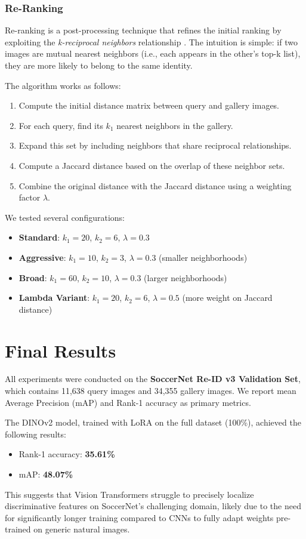 \documentclass[10pt,twocolumn,letterpaper]{article}
\begin{document}
\subsubsection{Re-Ranking}
Re-ranking is a post-processing technique that refines the initial ranking by exploiting the \textit{k-reciprocal neighbors} relationship \cite{reranking}. The intuition is simple: if two images are mutual nearest neighbors (i.e., each appears in the other's top-k list), they are more likely to belong to the same identity.

The algorithm works as follows:
\begin{enumerate}
    \item Compute the initial distance matrix between query and gallery images.
    \item For each query, find its $k_1$ nearest neighbors in the gallery.
    \item Expand this set by including neighbors that share reciprocal relationships.
    \item Compute a Jaccard distance based on the overlap of these neighbor sets.
    \item Combine the original distance with the Jaccard distance using a weighting factor $\lambda$.
\end{enumerate}

We tested several configurations:
\begin{itemize}
    \item \textbf{Standard}: $k_1=20$, $k_2=6$, $\lambda=0.3$
    \item \textbf{Aggressive}: $k_1=10$, $k_2=3$, $\lambda=0.3$ (smaller neighborhoods)
    \item \textbf{Broad}: $k_1=60$, $k_2=10$, $\lambda=0.3$ (larger neighborhoods)
    \item \textbf{Lambda Variant}: $k_1=20$, $k_2=6$, $\lambda=0.5$ (more weight on Jaccard distance)
\end{itemize}

\section{Final Results}

All experiments were conducted on the \textbf{SoccerNet Re-ID v3 Validation Set}, which contains 11,638 query images and 34,355 gallery images. We report mean Average Precision (mAP) and Rank-1 accuracy as primary metrics.

The DINOv2 model, trained with LoRA on the full dataset (100\%), achieved the following results:
\begin{itemize}
    \item Rank-1 accuracy: \textbf{35.61\%}
    \item mAP: \textbf{48.07\%}
\end{itemize}
This suggests that Vision Transformers struggle to precisely localize discriminative features on SoccerNet's challenging domain, likely due to the need for significantly longer training compared to CNNs to fully adapt weights pre-trained on generic natural images.
\end{document}
